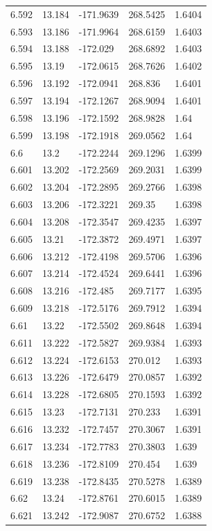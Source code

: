 \begin{tabular}{lllll}
6.592 & 13.184 & -171.9639 & 268.5425 & 1.6404 \\
6.593 & 13.186 & -171.9964 & 268.6159 & 1.6403 \\
6.594 & 13.188 & -172.029 & 268.6892 & 1.6403 \\
6.595 & 13.19 & -172.0615 & 268.7626 & 1.6402 \\
6.596 & 13.192 & -172.0941 & 268.836 & 1.6401 \\
6.597 & 13.194 & -172.1267 & 268.9094 & 1.6401 \\
6.598 & 13.196 & -172.1592 & 268.9828 & 1.64 \\
6.599 & 13.198 & -172.1918 & 269.0562 & 1.64 \\
6.6 & 13.2 & -172.2244 & 269.1296 & 1.6399 \\
6.601 & 13.202 & -172.2569 & 269.2031 & 1.6399 \\
6.602 & 13.204 & -172.2895 & 269.2766 & 1.6398 \\
6.603 & 13.206 & -172.3221 & 269.35 & 1.6398 \\
6.604 & 13.208 & -172.3547 & 269.4235 & 1.6397 \\
6.605 & 13.21 & -172.3872 & 269.4971 & 1.6397 \\
6.606 & 13.212 & -172.4198 & 269.5706 & 1.6396 \\
6.607 & 13.214 & -172.4524 & 269.6441 & 1.6396 \\
6.608 & 13.216 & -172.485 & 269.7177 & 1.6395 \\
6.609 & 13.218 & -172.5176 & 269.7912 & 1.6394 \\
6.61 & 13.22 & -172.5502 & 269.8648 & 1.6394 \\
6.611 & 13.222 & -172.5827 & 269.9384 & 1.6393 \\
6.612 & 13.224 & -172.6153 & 270.012 & 1.6393 \\
6.613 & 13.226 & -172.6479 & 270.0857 & 1.6392 \\
6.614 & 13.228 & -172.6805 & 270.1593 & 1.6392 \\
6.615 & 13.23 & -172.7131 & 270.233 & 1.6391 \\
6.616 & 13.232 & -172.7457 & 270.3067 & 1.6391 \\
6.617 & 13.234 & -172.7783 & 270.3803 & 1.639 \\
6.618 & 13.236 & -172.8109 & 270.454 & 1.639 \\
6.619 & 13.238 & -172.8435 & 270.5278 & 1.6389 \\
6.62 & 13.24 & -172.8761 & 270.6015 & 1.6389 \\
6.621 & 13.242 & -172.9087 & 270.6752 & 1.6388 \\

\end{tabular}
